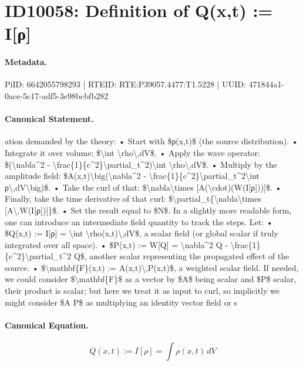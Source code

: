 \section*{ID10058: Definition of Q(x,t) := I[ρ]}
\paragraph{Metadata.}
PiID: 6642055798293 | RTEID: RTE:P39057.4477:T1.5228 | UUID: 471844a1-0ace-5c17-adf5-3e98bcbfb282

\paragraph{Canonical Statement.}
ation demanded by the theory: • Start with \$ρ(x,t)\$ (the source distribution). • Integrate it over volume: \$\textbackslash{}int \textbackslash{}rho\textbackslash{},dV\$. • Apply the wave operator: \$(\textbackslash{}nabla\textasciicircum{}2 - \textbackslash{}frac\{1\}\{c\textasciicircum{}2\}\textbackslash{}partial\_t\textasciicircum{}2)\textbackslash{}int \textbackslash{}rho\textbackslash{},dV\$. • Multiply by the amplitude field: \$A(x,t)\textbackslash{}big(\textbackslash{}nabla\textasciicircum{}2 - \textbackslash{}frac\{1\}\{c\textasciicircum{}2\}\textbackslash{}partial\_t\textasciicircum{}2\textbackslash{}int ρ\textbackslash{},dV\textbackslash{}big)\$. • Take the curl of that: \$\textbackslash{}nabla\textbackslash{}times [A(\textbackslash{}cdot)(W(I[ρ]))]\$. • Finally, take the time derivative of that curl: \$\textbackslash{}partial\_t\{\textbackslash{}nabla\textbackslash{}times [A\textbackslash{},W(I[ρ])]\}\$. • Set the result equal to \$N\$. In a slightly more readable form, one can introduce an intermediate field quantity to track the steps. Let: • \$Q(x,t) := I[ρ] = \textbackslash{}int \textbackslash{}rho(x,t)\textbackslash{},dV\$, a scalar field (or global scalar if truly integrated over all space). • \$P(x,t) := W[Q] = \textbackslash{}nabla\textasciicircum{}2 Q - \textbackslash{}frac\{1\}\{c\textasciicircum{}2\}\textbackslash{}partial\_t\textasciicircum{}2 Q\$, another scalar representing the propagated effect of the source. • \$\textbackslash{}mathbf\{F\}(x,t) := A(x,t)\textbackslash{},P(x,t)\$, a weighted scalar field. If needed, we could consider \$\textbackslash{}mathbf\{F\}\$ as a vector by \$A\$ being scalar and \$P\$ scalar, their product is scalar; but here we treat it as input to curl, so implicitly we might consider \$A P\$ as multiplying an identity vector field or s

\paragraph{Canonical Equation.}
\[
Q(x,t) := I[ρ] = \int \rho(x,t)\,dV
\]

